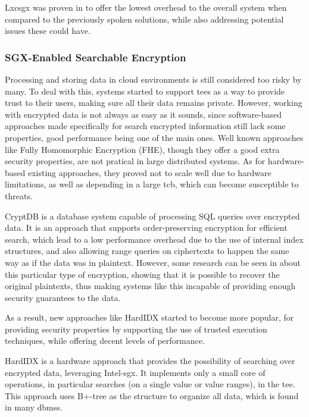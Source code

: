Lxcsgx was proven in \cite{lxcsgxPaper} to offer the lowest overhead to the overall system when compared to the previously spoken solutions, while also addressing potential issues these could have. 


\subsubsection{SGX-Enabled Searchable Encryption}

Processing and storing data in cloud environments is still considered too risky by many. To deal with this, systems started to support \gls{tee}s as a way to provide trust to their users, making sure all their data remains private. 
However, working with encrypted data is not always as easy as it sounds, since software-based approaches made specifically for search encrypted information still lack some properties, good performance being one of the main ones. Well known approaches like Fully Homomorphic Encryption (FHE), though they offer a good extra security properties, are not pratical in large distributed systems. As for hardware-based existing approaches, they proved not to scale well due to hardware limitations, as well as depending in a large \gls{tcb}, which can become susceptible to threats.

CryptDB \cite{cryptDBPaper} is a database system capable of processing SQL queries over encrypted data. It is an approach that supports order-preserving encryption for efficient search, which lead to a low performance overhead due to the use of internal index structures, and also allowing range queries on ciphertexts to happen the same way as if the data was in plaintext. However, some research can be seen in \cite{naveedPaper} about this particular type of encryption, showing that it is possible to recover the original plaintexts, thus making systems like this incapable of providing enough security guarantees to the data.

As a result, new approaches like HardIDX started to become more popular, for providing security properties by supporting the use of trusted execution techniques, while offering decent levels of performance.

HardIDX \cite{hardIDXPaper} is a hardware approach that provides the possibility of searching over encrypted data, leveraging Intel-\gls{sgx}. It implements only a small core of operations, in particular searches (on a single value or value ranges), in the \gls{tee}.
This approach uses B+-tree as the structure to organize all data, which is found in many \gls{dbms}s.


